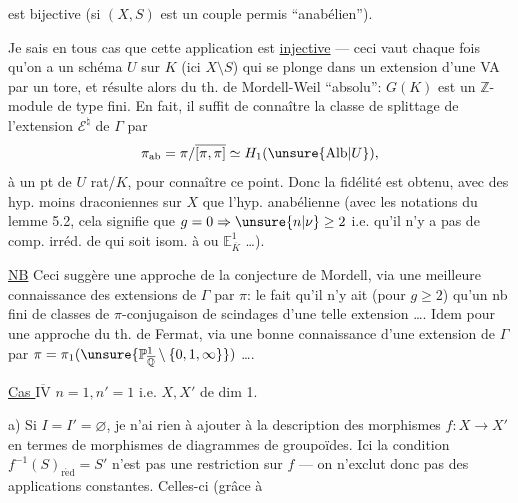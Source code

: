 

est bijective (si $(X,S)$ est un couple permis ``anabélien'').

Je sais en tous cas que cette application est \uline{injective} --- ceci vaut chaque fois qu'on a un schéma $U$ sur $K$ (ici $X\setminus S$) qui se plonge dans un  extension d'une VA par un tore, et résulte alors du th. de Mordell-Weil ``absolu'': $G(K)$ est un $\mathbb Z$-module de type fini.
En fait, il suffit de connaître la classe de splittage de l'extension $\mathcal E^{\natural}$ de $\Gamma$ par
\[
 \pi_{\mathrm{ab}}=\pi/\overline{[\pi,\pi]}\simeq H_1(\unsure{\mathrm{Alb}|U}),
\]
  à un pt de $U$ rat/$K$, pour connaître ce point. Donc la  fidélité est obtenu, avec des hyp. moins draconiennes sur $X$ que l'hyp. anabélienne (avec les notations du lemme 5.2, cela signifie que $g=0\Rightarrow\unsure{n|\nu}\ge2$ i.e. qu'il n'y a pas de comp. irréd. de  qui soit isom. à  ou $\mathbb E^1_{\overline K}$ \ldots).



\uline{NB} Ceci suggère une approche de la conjecture de Mordell, via une meilleure connaissance des extensions de $\Gamma$ par $\pi$: le fait qu'il n'y ait (pour $g\ge2$) qu'un nb fini de classes de $\pi$-conjugaison de scindages d'une telle extension \ldots.
Idem pour une approche du th. de Fermat, via  une bonne connaissance d'une extension de $\Gamma$ par $\pi=\pi_1(\unsure{\mathbb P^1_{\overline{\mathbb Q}}\setminus\{0,1,\infty\}})$ \ldots.

\uline{Cas $\overline{\mathrm{IV}}$} $n=1,n'=1$ i.e. $X,X'$ de dim 1.

a) Si $I=I'=\varnothing$, je n'ai rien à ajouter à la description des morphismes $f:X\to X'$ en termes de morphismes de diagrammes de groupoïdes. Ici  la condition $f^{-1}(S)_{\mathrm{r\acute ed}}=S'$ n'est pas une restriction sur $f$ ---  on n'exclut donc pas des applications constantes. Celles-ci (grâce à

